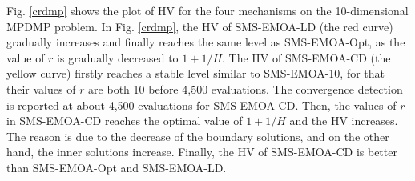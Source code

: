 \documentclass[conference]{IEEEtran}
\begin{document}
Fig. \ref{crdmp} shows the plot of HV for the four mechanisms on the 10-dimensional MPDMP problem. 
In Fig. \ref{crdmp}, the HV of SMS-EMOA-LD (the red curve) gradually increases and finally reaches the same level as SMS-EMOA-Opt, 
as the value of $r$ is gradually decreased to $1+1/H$. 
The HV of SMS-EMOA-CD (the yellow curve) firstly reaches a stable level similar to SMS-EMOA-10, 
for that their values of $r$ are both 10 before 4,500 evaluations. 
The convergence detection is reported at about 4,500 evaluations for SMS-EMOA-CD. 
Then, the values of $r$ in SMS-EMOA-CD reaches the optimal value of $1+1/H$ and the HV increases. 
The reason is due to the decrease of the boundary solutions, and on the other hand, the inner solutions increase. 
Finally, the HV of SMS-EMOA-CD is better than SMS-EMOA-Opt and SMS-EMOA-LD. 
\end{document}
